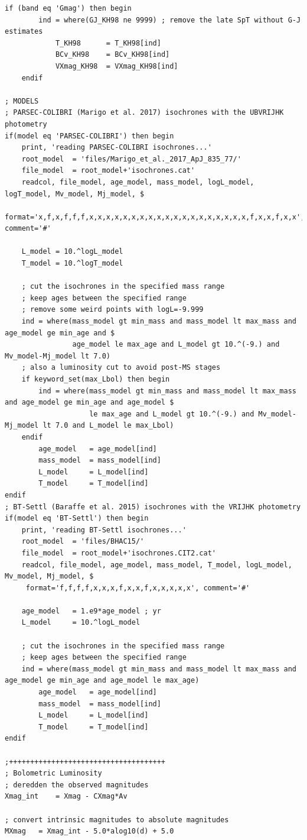 \documentclass[12pt]{article}
\begin{document}
{\begin{Verbatim}[tabsize=4]
	if (band eq 'Gmag') then begin
		ind	= where(GJ_KH98 ne 9999) ; remove the late SpT without G-J estimates
			T_KH98		= T_KH98[ind]
			BCv_KH98	= BCv_KH98[ind]
			VXmag_KH98	= VXmag_KH98[ind]
	endif

; MODELS
; PARSEC-COLIBRI (Marigo et al. 2017) isochrones with the UBVRIJHK photometry
if(model eq 'PARSEC-COLIBRI') then begin
	print, 'reading PARSEC-COLIBRI isochrones...'
	root_model	= 'files/Marigo_et_al._2017_ApJ_835_77/'
	file_model	= root_model+'isochrones.cat'
	readcol, file_model, age_model, mass_model, logL_model, logT_model, Mv_model, Mj_model, $
	 format='x,f,x,f,f,f,x,x,x,x,x,x,x,x,x,x,x,x,x,x,x,x,x,x,x,f,x,x,f,x,x', comment='#'
	
	L_model	= 10.^logL_model
	T_model	= 10.^logT_model
	
	; cut the isochrones in the specified mass range
	; keep ages between the specified range
	; remove some weird points with logL=-9.999
	ind	= where(mass_model gt min_mass and mass_model lt max_mass and age_model ge min_age and $
				age_model le max_age and L_model gt 10.^(-9.) and Mv_model-Mj_model lt 7.0)
	; also a luminosity cut to avoid post-MS stages
	if keyword_set(max_Lbol) then begin
		ind = where(mass_model gt min_mass and mass_model lt max_mass and age_model ge min_age and age_model $
					le max_age and L_model gt 10.^(-9.) and Mv_model-Mj_model lt 7.0 and L_model le max_Lbol)
	endif
		age_model	= age_model[ind]
		mass_model	= mass_model[ind]
		L_model		= L_model[ind]
		T_model		= T_model[ind]
endif
; BT-Settl (Baraffe et al. 2015) isochrones with the VRIJHK photometry
if(model eq 'BT-Settl') then begin
	print, 'reading BT-Settl isochrones...'
	root_model	= 'files/BHAC15/'
	file_model	= root_model+'isochrones.CIT2.cat'
	readcol, file_model, age_model, mass_model, T_model, logL_model, Mv_model, Mj_model, $
	 format='f,f,f,f,x,x,x,f,x,x,f,x,x,x,x,x', comment='#'
	
	age_model	= 1.e9*age_model ; yr
	L_model		= 10.^logL_model 

	; cut the isochrones in the specified mass range
	; keep ages between the specified range
	ind	= where(mass_model gt min_mass and mass_model lt max_mass and age_model ge min_age and age_model le max_age)
		age_model	= age_model[ind]
		mass_model	= mass_model[ind]
		L_model		= L_model[ind]
		T_model		= T_model[ind]
endif

;+++++++++++++++++++++++++++++++++++++
; Bolometric Luminosity
; deredden the observed magnitudes
Xmag_int	= Xmag - CXmag*Av

; convert intrinsic magnitudes to absolute magnitudes
MXmag	= Xmag_int - 5.0*alog10(d) + 5.0


\end{Verbatim}}
\end{document}
